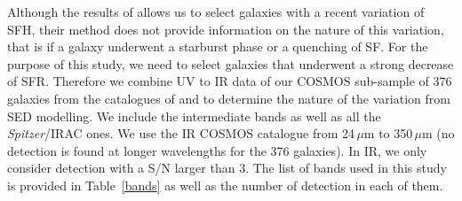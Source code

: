 \documentclass[traditabstract]{aa} %
\begin{document}
Although the results of \cite{Aufort20} allows us to select galaxies with a recent variation of SFH, their method does not provide information on the nature of this variation, that is if a galaxy underwent a starburst phase or a quenching of SF.
For the purpose of this study, we need to select galaxies that underwent a strong decrease of SFR.
Therefore we combine UV to IR data of our COSMOS sub-sample of 376 galaxies from the catalogues of \cite{Laigle16} and \cite{Jin18} to determine the nature of the variation from SED modelling.
We include the intermediate bands as well as all the \textit{Spitzer}/IRAC ones.
We use the \cite{Jin18} IR COSMOS catalogue from 24\,$\mu$m to 350\,$\mu$m (no detection is found at longer wavelengths for the 376 galaxies).
In IR, we only consider detection with a S/N larger than 3.
The list of bands used in this study is provided in Table~\ref{bands} as well as the number of detection in each of them.
\end{document}
